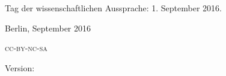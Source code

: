 \begin{titlepage}
\begin{addmargin}[-1cm]{-3cm}
\begin{center}
				\vspace{0.7cm}
				Tag der wissenschaftlichen Aussprache: 1. September 2016.



				\vspace{1.4cm}
				Berlin, September 2016

				\vspace{0.7cm}	
				\textsc{\MakeLowercase{CC-BY-NC-SA}}

                  		Version: \textsc{\myVersion}
        \vfill                      

    \end{center}  
  \end{addmargin}       
\end{titlepage}   
